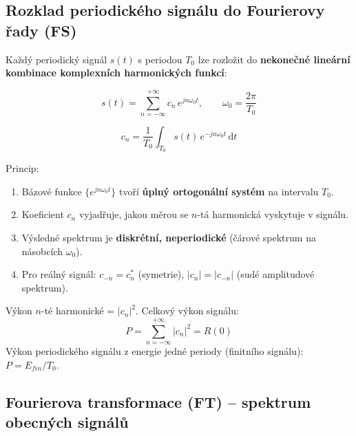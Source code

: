 \documentclass[12pt,a4paper]{article}
\newcommand{\dd}{\mathrm{d}}
\begin{document}
\begin{hvezdBox}
\subsection*{Rozklad periodického signálu do Fourierovy řady (FS)}
\end{hvezdBox}

Každý periodický signál $s(t)$ s periodou $T_0$ lze rozložit do \textbf{nekonečné lineární kombinace komplexních harmonických funkcí}:

\begin{matBox}
\[
  s(t) = \sum_{n=-\infty}^{+\infty} c_n\, e^{j n \omega_0 t}, \qquad \omega_0 = \frac{2\pi}{T_0}
\]
\end{matBox}

\begin{matBox}
\[
  c_n = \frac{1}{T_0}\int_{T_0} s(t)\, e^{-j n \omega_0 t}\,\dd t
\]
\end{matBox}

Princip:
\begin{enumerate}
  \item Bázové funkce $\{e^{jn\omega_0 t}\}$ tvoří \textbf{úplný ortogonální systém} na intervalu $T_0$.
  \item Koeficient $c_n$ vyjadřuje, jakou měrou se $n$-tá harmonická vyskytuje v signálu.
  \item Výsledné spektrum je \textbf{diskrétní, neperiodické} (čárové spektrum na násobcích $\omega_0$).
  \item Pro reálný signál: $c_{-n} = c_n^*$ (symetrie), $|c_n| = |c_{-n}|$ (sudé amplitudové spektrum).
\end{enumerate}

\begin{noteBox}
Výkon $n$-té harmonické = $|c_n|^2$. Celkový výkon signálu:
\[
  P = \sum_{n=-\infty}^{+\infty} |c_n|^2 = R(0)
\]
Výkon periodického signálu z energie jedné periody (finitního signálu): $P = E_{fin}/T_0$.
\end{noteBox}

\begin{hvezdBox}
\subsection*{Fourierova transformace (FT) – spektrum obecných signálů}
\end{hvezdBox}
\end{document}

